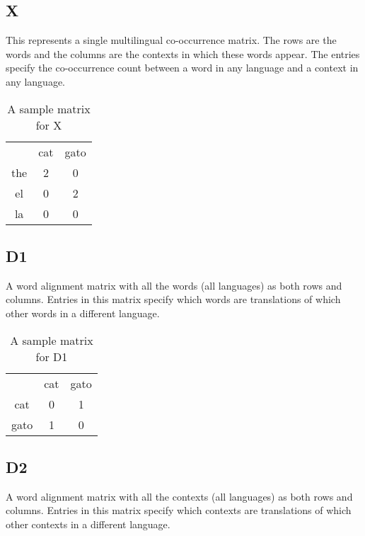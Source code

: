 \documentclass[11pt]{article}
\begin{document}
\subsection{X}
This represents a single multilingual co-occurrence matrix. The rows are the words and the columns are the contexts in which these words appear. The entries specify the co-occurrence count between a word in any language and a context in any language.

\begin{table}[h]  
\begin{center}
\begin{tabular}{ |c|c|c| } 
  \hline
  & cat & gato \\ 
  the & 2 & 0 \\ 
  el & 0 & 2 \\ 
  la & 0 & 0 \\ 
  \hline
\end{tabular}
\end{center}
\caption{\label{font-table} A sample matrix for X }
\end{table}

\subsection{D1}
A word alignment matrix with all the words (all languages) as both rows and columns.
Entries in this matrix specify which words are translations of which other words in a different language.


\begin{table}[h]
\begin{center}
\begin{tabular}{ |c|c|c| } 
  \hline
  & cat & gato \\ 
  cat & 0 & 1 \\ 
  gato & 1 & 0 \\ 
  \hline
\end{tabular}
\end{center}
\caption{\label{font-table} A sample matrix for D1 }
\end{table}

\subsection{D2}
A word alignment matrix with all the contexts (all languages) as both rows and columns.
Entries in this matrix specify which contexts are translations of which other contexts in a different language.
\end{document}
